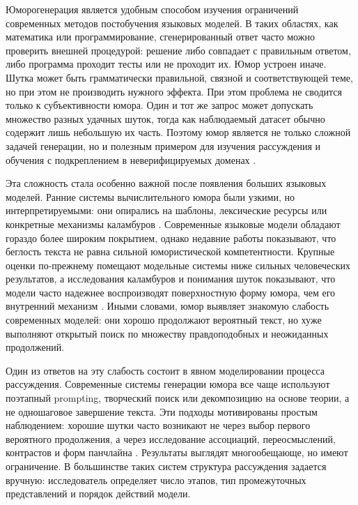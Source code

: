 Юморогенерация является удобным способом изучения ограничений современных методов постобучения языковых моделей. В таких областях, как математика или программирование, сгенерированный ответ часто можно проверить внешней процедурой: решение либо совпадает с правильным ответом, либо программа проходит тесты или не проходит их. Юмор устроен иначе. Шутка может быть грамматически правильной, связной и соответствующей теме, но при этом не производить нужного эффекта. При этом проблема не сводится только к субъективности юмора. Один и тот же запрос может допускать множество разных удачных шуток, тогда как наблюдаемый датасет обычно содержит лишь небольшую их часть. Поэтому юмор является не только сложной задачей генерации, но и полезным примером для изучения рассуждения и обучения с подкреплением в неверифицируемых доменах \citep{Loakman2025,lemmens2026computational}.

Эта сложность стала особенно важной после появления больших языковых моделей. Ранние системы вычислительного юмора были узкими, но интерпретируемыми: они опирались на шаблоны, лексические ресурсы или конкретные механизмы каламбуров \citep{ritchie2001current,amin2020survey}. Современные языковые модели обладают гораздо более широким покрытием, однако недавние работы показывают, что беглость текста не равна сильной юмористической компетентности. Крупные оценки по-прежнему помещают модельные системы ниже сильных человеческих результатов, а исследования каламбуров и понимания шуток показывают, что модели часто надежнее воспроизводят поверхностную форму юмора, чем его внутренний механизм \citep{Zhang2024HumorAI,xu2024good,cocchieri2025you,loakman2025comparing}. Иными словами, юмор выявляет знакомую слабость современных моделей: они хорошо продолжают вероятный текст, но хуже выполняют открытый поиск по множеству правдоподобных и неожиданных продолжений.

Один из ответов на эту слабость состоит в явном моделировании процесса рассуждения. Современные системы генерации юмора все чаще используют поэтапный prompting, творческий поиск или декомпозицию на основе теории, а не одношаговое завершение текста. Эти подходы мотивированы простым наблюдением: хорошие шутки часто возникают не через выбор первого вероятного продолжения, а через исследование ассоциаций, переосмыслений, контрастов и форм панчлайна \citep{chen2023prompt,zhong2024let,Tikhonov2024,Kim2025,ZhangJ2025}. Результаты выглядят многообещающе, но имеют ограничение. В большинстве таких систем структура рассуждения задается вручную: исследователь определяет число этапов, тип промежуточных представлений и порядок действий модели.


